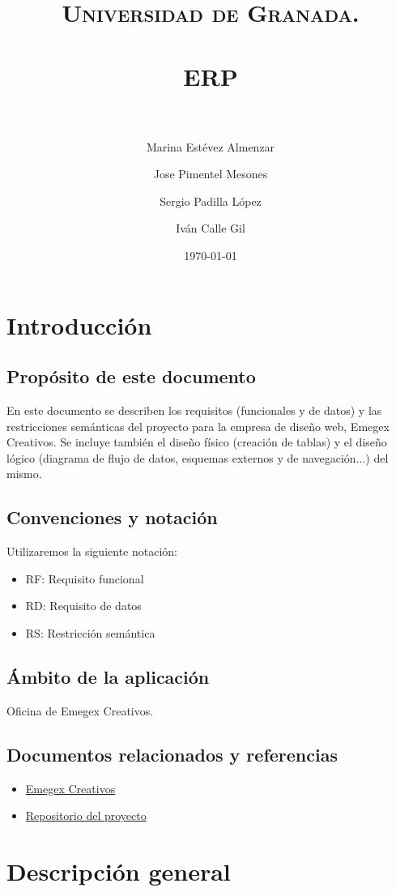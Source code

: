 \documentclass[paper=a4, fontsize=11pt, spanish]{scrartcl}
\title{
  \normalfont \normalsize
  \textsc{Universidad de Granada.} \\ [25pt]
  \horrule{0.5pt} \\[0.4cm]
  \huge ERP \\
  \horrule{2pt} \\[0.5cm]
}
\author{Marina Estévez Almenzar\\
\and
Jose Pimentel Mesones\\
\and
Sergio Padilla López\\
\and
Iván Calle Gil\\}
\date{\normalsize\today}
\begin{document}
\maketitle
\newpage

\tableofcontents

\newpage

\section{Introducción}
\subsection{Propósito de este documento}
\setlength{\parindent}{3em} En este documento se describen los requisitos (funcionales y de datos) y las restricciones
semánticas del proyecto para la empresa de diseño web, Emegex Creativos. Se incluye también el diseño físico (creación de tablas) y el diseño lógico (diagrama de flujo de datos, esquemas externos y de navegación...) del mismo.
\subsection{Convenciones y notación}
\setlength{\parindent}{0em} Utilizaremos la siguiente notación:
\begin{itemize}
\item RF: Requisito funcional
\item RD: Requisito de datos
\item RS: Restricción semántica
\end{itemize}

\subsection{Ámbito de la aplicación}
\setlength{\parindent}{3em} Oficina de Emegex Creativos.

\subsection{Documentos relacionados y referencias}
\begin{itemize}
\item \href{http://emegex.com}{Emegex Creativos}
\item \href{https://github.com/SergioPadilla/ERP}{Repositorio del proyecto}
\end{itemize}

\section{Descripción general}
\end{document}
